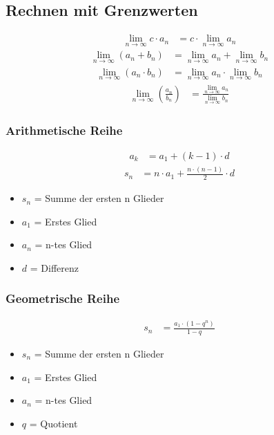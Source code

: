 \subsection{Rechnen mit Grenzwerten}
\begin{align*}
	\lim_{n \to \infty} c \cdot a_n & = c \cdot \lim_{n \to \infty} a_n
\end{align*}
\begin{align*}
	\lim_{n \to \infty} (a_n + b_n) & = \lim_{n \to \infty} a_n + \lim_{n \to \infty} b_n
\end{align*}
\begin{align*}
	\lim_{n \to \infty} (a_n \cdot b_n) & = \lim_{n \to \infty} a_n \cdot \lim_{n \to \infty} b_n
\end{align*}
\begin{align*}
	\lim_{n \to \infty}(\frac{a_n}{b_n}) & = \frac{\lim_{n \to \infty} a_n}{\lim_{n \to \infty} b_n}
\end{align*}
\subsubsection{Arithmetische Reihe}
\begin{align*}
	a_k & = a_1 + (k-1) \cdot d
\end{align*}
\begin{align*}
    s_n & =n \cdot a_1 + \frac{n \cdot (n-1)}{2} \cdot d
\end{align*}
\begin{itemize}
	\item $s_n$ = Summe der ersten n Glieder
	\item $a_1$ = Erstes Glied
	\item $a_n$ = n-tes Glied
	\item $d$ = Differenz
\end{itemize}
\subsubsection{Geometrische Reihe}
\begin{align*}
    s_n & = \frac{a_1 \cdot (1-q^n)}{1-q}
\end{align*}
\begin{itemize}
	\item $s_n$ = Summe der ersten n Glieder
	\item $a_1$ = Erstes Glied
	\item $a_n$ = n-tes Glied
	\item $q$ = Quotient
\end{itemize}
